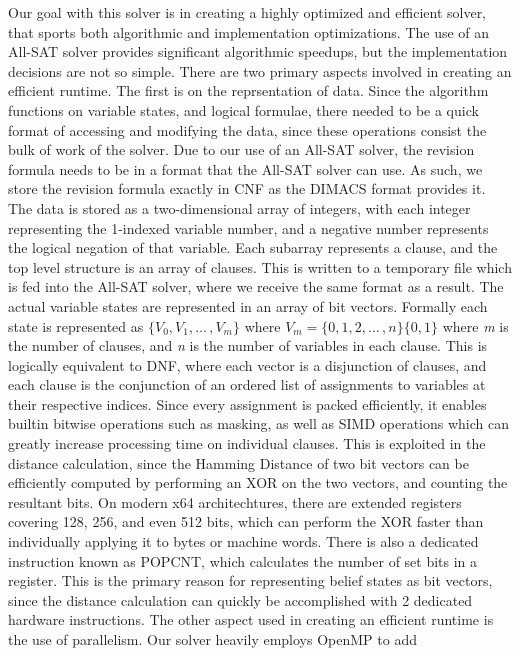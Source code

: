\documentclass[english]{article}
\begin{document}
Our goal with this solver is in creating a highly optimized and efficient
solver, that sports both algorithmic and implementation optimizations.
The use of an All-SAT solver provides significant algorithmic speedups,
but the implementation decisions are not so simple. There are two
primary aspects involved in creating an efficient runtime. The first
is on the reprsentation of data. Since the algorithm functions on
variable states, and logical formulae, there needed to be a quick
format of accessing and modifying the data, since these operations
consist the bulk of work of the solver. Due to our use of an All-SAT
solver, the revision formula needs to be in a format that the All-SAT
solver can use. As such, we store the revision formula exactly in
CNF as the DIMACS format provides it. The data is stored as a two-dimensional
array of integers, with each integer representing the 1-indexed variable
number, and a negative number represents the logical negation of that
variable. Each subarray represents a clause, and the top level structure
is an array of clauses. This is written to a temporary file which
is fed into the All-SAT solver, where we receive the same format as
a result. The actual variable states are represented in an array of
bit vectors. Formally each state is represented as $\{V_{0},V_{1},\ldots\,,V_{m}\}$
where $V_{m}=\{0,1,2,\ldots\,,n\}\{0,1\}$ where \emph{m} is the number
of clauses, and \emph{n} is the number of variables in each clause.
This is logically equivalent to DNF, where each vector is a disjunction
of clauses, and each clause is the conjunction of an ordered list
of assignments to variables at their respective indices. Since every
assignment is packed efficiently, it enables builtin bitwise operations
such as masking, as well as SIMD operations which can greatly increase
processing time on individual clauses. This is exploited in the distance
calculation, since the Hamming Distance of two bit vectors can be
efficiently computed by performing an XOR on the two vectors, and
counting the resultant bits. On modern x64 architechtures, there are
extended registers covering 128, 256, and even 512 bits, which can
perform the XOR faster than individually applying it to bytes or machine
words. There is also a dedicated instruction known as POPCNT, which
calculates the number of set bits in a register. This is the primary
reason for representing belief states as bit vectors, since the distance
calculation can quickly be accomplished with 2 dedicated hardware
instructions. The other aspect used in creating an efficient runtime
is the use of parallelism. Our solver heavily employs OpenMP to add
\end{document}
